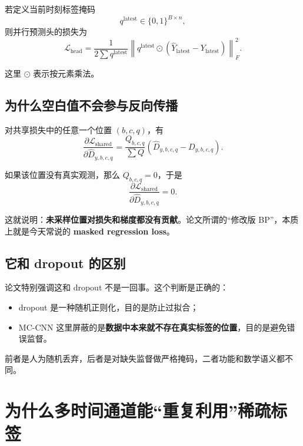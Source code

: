 \documentclass[UTF8]{ctexart}
\begin{document}
若定义当前时刻标签掩码
\begin{equation}
    q^{\text{latest}} \in \{0,1\}^{B \times n},
\end{equation}
则并行预测头的损失为
\begin{equation}
    \mathcal{L}_{\text{head}}
    =
    \frac{1}{2 \sum q^{\text{latest}}}
    \left\|
        q^{\text{latest}} \odot (\hat{Y}_{\text{latest}} - Y_{\text{latest}})
    \right\|_F^2.
\end{equation}

这里 $\odot$ 表示按元素乘法。

\subsection{为什么空白值不会参与反向传播}

对共享损失中的任意一个位置 $(b,c,q)$，有
\begin{equation}
    \frac{\partial \mathcal{L}_{\text{shared}}}{\partial \hat{D}_{y,b,c,q}}
    =
    \frac{Q_{b,c,q}}{\sum Q}
    \left(
        \hat{D}_{y,b,c,q} - D_{y,b,c,q}
    \right).
\end{equation}

如果该位置没有真实观测，那么 $Q_{b,c,q}=0$，于是
\begin{equation}
    \frac{\partial \mathcal{L}_{\text{shared}}}{\partial \hat{D}_{y,b,c,q}} = 0.
\end{equation}

这就说明：\textbf{未采样位置对损失和梯度都没有贡献}。论文所谓的“修改版 BP”，本质上就是今天常说的 \textbf{masked regression loss}。

\subsection{它和 dropout 的区别}

论文特别强调这和 dropout 不是一回事。这个判断是正确的：
\begin{itemize}
    \item dropout 是一种随机正则化，目的是防止过拟合；
    \item MC-CNN 这里屏蔽的是\textbf{数据中本来就不存在真实标签的位置}，目的是避免错误监督。
\end{itemize}

前者是人为随机丢弃，后者是对缺失监督做严格掩码，二者功能和数学语义都不同。

\section{为什么多时间通道能“重复利用”稀疏标签}
\end{document}
